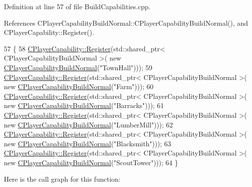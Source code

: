 Definition at line 57 of file Build\+Capabilities.\+cpp.



References C\+Player\+Capability\+Build\+Normal\+::\+C\+Player\+Capability\+Build\+Normal(), and C\+Player\+Capability\+::\+Register().


\begin{DoxyCode}
57                                                     \{
58     \hyperlink{classCPlayerCapability_a7e298018dcde2684451add3cfff065f7}{CPlayerCapability::Register}(std::shared\_ptr< CPlayerCapabilityBuildNormal >(\textcolor{keyword}{
      new} \hyperlink{classCPlayerCapabilityBuildNormal_a36157bf1a2875f0831b646dd2313a464}{CPlayerCapabilityBuildNormal}(\textcolor{stringliteral}{"TownHall"})));   
59     \hyperlink{classCPlayerCapability_a7e298018dcde2684451add3cfff065f7}{CPlayerCapability::Register}(std::shared\_ptr< CPlayerCapabilityBuildNormal >(\textcolor{keyword}{
      new} \hyperlink{classCPlayerCapabilityBuildNormal_a36157bf1a2875f0831b646dd2313a464}{CPlayerCapabilityBuildNormal}(\textcolor{stringliteral}{"Farm"})));
60     \hyperlink{classCPlayerCapability_a7e298018dcde2684451add3cfff065f7}{CPlayerCapability::Register}(std::shared\_ptr< CPlayerCapabilityBuildNormal >(\textcolor{keyword}{
      new} \hyperlink{classCPlayerCapabilityBuildNormal_a36157bf1a2875f0831b646dd2313a464}{CPlayerCapabilityBuildNormal}(\textcolor{stringliteral}{"Barracks"})));   
61     \hyperlink{classCPlayerCapability_a7e298018dcde2684451add3cfff065f7}{CPlayerCapability::Register}(std::shared\_ptr< CPlayerCapabilityBuildNormal >(\textcolor{keyword}{
      new} \hyperlink{classCPlayerCapabilityBuildNormal_a36157bf1a2875f0831b646dd2313a464}{CPlayerCapabilityBuildNormal}(\textcolor{stringliteral}{"LumberMill"})));
62     \hyperlink{classCPlayerCapability_a7e298018dcde2684451add3cfff065f7}{CPlayerCapability::Register}(std::shared\_ptr< CPlayerCapabilityBuildNormal >(\textcolor{keyword}{
      new} \hyperlink{classCPlayerCapabilityBuildNormal_a36157bf1a2875f0831b646dd2313a464}{CPlayerCapabilityBuildNormal}(\textcolor{stringliteral}{"Blacksmith"})));
63     \hyperlink{classCPlayerCapability_a7e298018dcde2684451add3cfff065f7}{CPlayerCapability::Register}(std::shared\_ptr< CPlayerCapabilityBuildNormal >(\textcolor{keyword}{
      new} \hyperlink{classCPlayerCapabilityBuildNormal_a36157bf1a2875f0831b646dd2313a464}{CPlayerCapabilityBuildNormal}(\textcolor{stringliteral}{"ScoutTower"})));
64 \}
\end{DoxyCode}
Here is the call graph for this function\+:\nopagebreak
